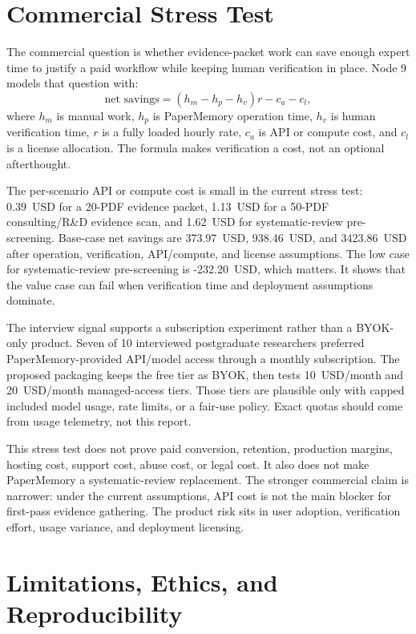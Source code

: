 \section{Commercial Stress Test}
\label{sec:commercial-stress}

The commercial question is whether evidence-packet work can save enough expert time to justify a paid workflow while keeping human verification in place. Node 9 models that question with:
\[
\text{net savings} = (h_m - h_p - h_v) r - c_a - c_l,
\]
where $h_m$ is manual work, $h_p$ is PaperMemory operation time, $h_v$ is human verification time, $r$ is a fully loaded hourly rate, $c_a$ is API or compute cost, and $c_l$ is a license allocation. The formula makes verification a cost, not an optional afterthought.



The per-scenario API or compute cost is small in the current stress test: 0.39~USD for a 20-PDF evidence packet, 1.13~USD for a 50-PDF consulting/R\&D evidence scan, and 1.62~USD for systematic-review pre-screening. Base-case net savings are 373.97~USD, 938.46~USD, and 3423.86~USD after operation, verification, API/compute, and license assumptions. The low case for systematic-review pre-screening is -232.20~USD, which matters. It shows that the value case can fail when verification time and deployment assumptions dominate.



The interview signal supports a subscription experiment rather than a BYOK-only product. Seven of 10 interviewed postgraduate researchers preferred PaperMemory-provided API/model access through a monthly subscription. The proposed packaging keeps the free tier as BYOK, then tests 10~USD/month and 20~USD/month managed-access tiers. Those tiers are plausible only with capped included model usage, rate limits, or a fair-use policy. Exact quotas should come from usage telemetry, not this report.

This stress test does not prove paid conversion, retention, production margins, hosting cost, support cost, abuse cost, or legal cost. It also does not make PaperMemory a systematic-review replacement. The stronger commercial claim is narrower: under the current assumptions, API cost is not the main blocker for first-pass evidence gathering. The product risk sits in user adoption, verification effort, usage variance, and deployment licensing.

\section{Limitations, Ethics, and Reproducibility}
\label{sec:limitations-ethics-reproducibility}

